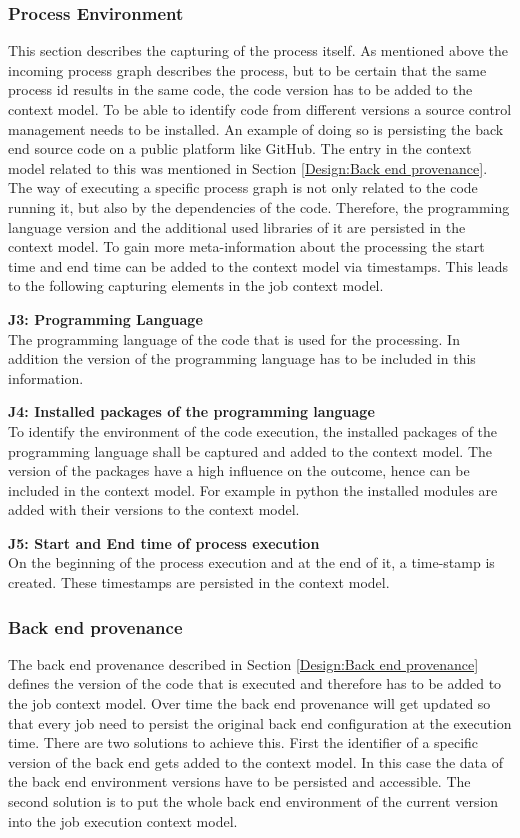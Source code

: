 \documentclass[draft,final]{vutinfth} %
\begin{document}
\subsubsection{Process Environment}\label{Job:Process Data}
This section describes the capturing of the process itself. As mentioned above the incoming process graph describes the process, but to be certain that the same process id results in the same code, the code version has to be added to the context model. To be able to identify code from different versions a source control management needs to be installed. An example of doing so is persisting the back end source code on a public platform like GitHub. The entry in the context model related to this was mentioned in Section \ref{Design:Back end provenance}.  \\
The way of executing a specific process graph is not only related to the code running it, but also by the dependencies of the code. Therefore, the programming language version and the additional used libraries of it are persisted in the context model. To gain more meta-information about the processing the start time and end time can be added to the context model via timestamps. This leads to the following capturing elements in the job context model.

\textbf{J3: Programming Language}\\
The programming language of the code that is used for the processing. In addition the version of the programming language has to be included in this information.

\textbf{J4: Installed packages of the programming language}\\
To identify the environment of the code execution, the installed packages of the programming language shall be captured and added to the context model. The version of the packages have a high influence on the outcome, hence can be included in the context model. For example in python the installed modules are added with their versions to the context model.

\textbf{J5: Start and End time of process execution}\\
On the beginning of the process execution and at the end of it, a time-stamp is created. These timestamps are persisted in the context model.

\subsubsection{Back end provenance}\label{Job:Back end provenance}
The back end provenance described in Section \ref{Design:Back end provenance} defines the version of the code that is executed and therefore has to be added to the job context model. Over time the back end provenance will get updated so that every job need to persist the original back end configuration at the execution time. There are two solutions to achieve this. First the identifier of a specific version of the back end gets added to the context model. In this case the data of the back end environment versions have to be persisted and accessible. The second solution is to put the whole back end environment of the current version into the job execution context model.
\end{document}
